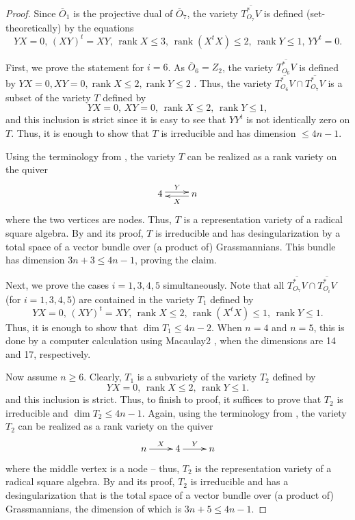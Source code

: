 \documentclass[11pt,reqno]{amsart}
\newcommand{\ol}[1]{\overline{#1}}
\newcommand{\op}[1]{\operatorname{#1}}
\numberwithin{equation}{section}
\begin{document}
\begin{proof}
Since $\ol{O}_1$ is the projective dual of $\ol{O}_7$, the variety $\ol{T_{O_7}^* V}$ is defined (set-theoretically) by the equations 
\[YX = 0, \, (XY)^t = XY, \, \op{rank} X \leq 3, \, \op{rank} (X^t X)\leq 2, \, \op{rank} Y \leq 1, \, Y Y^t = 0.\]

First, we prove the statement for $i=6$. As $\ol{O}_6 = Z_2$, the variety $\ol{T_{O_6}^* V}$ is defined by $YX = 0, XY=0, \op{rank} X \leq 2, \op{rank} Y \leq 2$ \cite{strickland}. Thus, the variety  $\ol{T_{O_6}^* V} \cap \ol{T_{O_7}^* V}$ is a subset of the variety $T$ defined by 
\[YX = 0, \, XY=0, \, \op{rank} X \leq 2, \,  \op{rank} Y \leq 1,\]
and this inclusion is strict since it is easy to see that $Y Y^t$ is not identically zero on $T$. Thus, it is enough to show that $T$ is irreducible and has dimension $\leq 4n-1$.

Using the terminology from \cite{node}, the variety $T$ can be realized as a rank variety on the quiver
\[\xymatrix{ 4 \ar@<0.5ex>[r]^Y  & n \ar@<0.5ex>[l]^X}\]
where the two vertices are nodes. Thus, $T$ is a representation variety of a radical square algebra. By \cite[Theorem 3.19]{node} and its proof, $T$ is irreducible and has desingularization by a total space of a vector bundle over (a product of) Grassmannians. This bundle has dimension $3n+3 \leq 4n-1$, proving the claim.

Next, we prove the cases $i=1,3,4,5$ simultaneously. Note that all $\ol{T_{O_7}^* V} \cap \ol{T_{O_i}^* V}$ (for  $i=1,3,4,5$)  are contained in the variety $T_1$ defined by
\[YX = 0, \, (XY)^t = XY, \, \op{rank} X \leq 2, \, \op{rank} (X^t X)\leq 1, \, \op{rank} Y \leq 1.\]
Thus, it is enough to show that $\dim T_1 \leq 4n - 2$. When $n=4$ and $n=5$, this is done by a computer calculation using Macaulay2 \cite{M2}, when the dimensions are 14 and 17, respectively.

Now assume $n\geq 6$. Clearly, $T_1$ is a subvariety of the variety $T_2$ defined by
\[ YX = 0, \, \op{rank} X \leq 2, \, \op{rank} Y \leq 1.\]
and this inclusion is strict. Thus, to finish to proof, it suffices to prove that $T_2$ is irreducible and $\dim T_2 \leq 4n-1$. Again, using the terminology from \cite{node}, the variety $T_2$ can be realized as a rank variety on the quiver
\[\xymatrix{ n \ar[r]^X & 4 \ar[r]^Y & n }\]
where the middle vertex is a node -- thus, $T_2$ is the representation variety of a radical square algebra.  By \cite[Theorem 3.19]{node} and its proof, $T_2$ is irreducible and has a desingularization that is the total space of a vector bundle over (a product of) Grassmannians, the dimension of which is $3n+5 \leq 4n-1$.
\end{proof}
\end{document}
